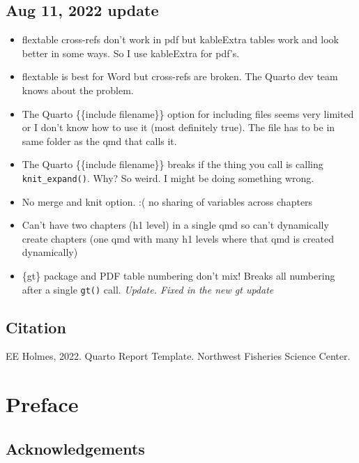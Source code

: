 \documentclass[
  letterpaper,
  oneside]{scrbook}
\providecommand{\tightlist}{%
  \setlength{\itemsep}{0pt}\setlength{\parskip}{0pt}}\usepackage{longtable,booktabs,array}
\begin{document}
\hypertarget{aug-11-2022-update}{%
\section{Aug 11, 2022 update}\label{aug-11-2022-update}}

\begin{itemize}
\tightlist
\item
  flextable cross-refs don't work in pdf but kableExtra tables work and
  look better in some ways. So I use kableExtra for pdf's.
\item
  flextable is best for Word but cross-refs are broken. The Quarto dev
  team knows about the problem.
\item
  The Quarto \{\{include filename\}\} option for including files seems
  very limited or I don't know how to use it (most definitely true). The
  file has to be in same folder as the qmd that calls it.
\item
  The Quarto \{\{include filename\}\} breaks if the thing you call is
  calling \texttt{knit\_expand()}. Why? So weird. I might be doing
  something wrong.
\item
  No merge and knit option. :( no sharing of variables across chapters
\item
  Can't have two chapters (h1 level) in a single qmd so can't
  dynamically create chapters (one qmd with many h1 levels where that
  qmd is created dynamically)
\item
  \{gt\} package and PDF table numbering don't mix! Breaks all numbering
  after a single \texttt{gt()} call. \emph{Update. Fixed in the new gt
  update}
\end{itemize}

\hypertarget{citation}{%
\section*{Citation}\label{citation}}


EE Holmes, 2022. Quarto Report Template. Northwest Fisheries Science
Center.


\hypertarget{preface}{%
\chapter{Preface}\label{preface}}

\hypertarget{acknowledgements}{%
\section*{Acknowledgements}\label{acknowledgements}}
\end{document}
